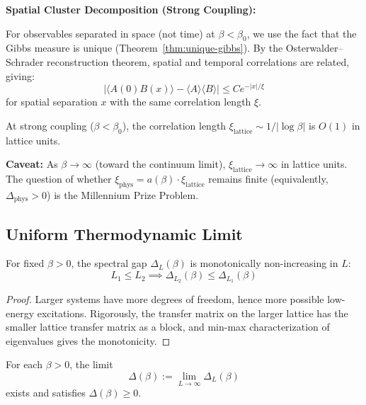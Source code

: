 \textbf{Spatial Cluster Decomposition (Strong Coupling):}

For observables separated in space (not time) at $\beta < \beta_0$, we use 
the fact that the Gibbs measure is unique (Theorem~\ref{thm:unique-gibbs}). 
By the Osterwalder--Schrader reconstruction theorem, spatial and temporal 
correlations are related, giving:
\[
|\langle A(0) B(x) \rangle - \langle A \rangle \langle B \rangle| \leq C e^{-|x|/\xi}
\]
for spatial separation $x$ with the same correlation length $\xi$.

\begin{remark}
At strong coupling ($\beta < \beta_0$), the correlation length 
$\xi_{\text{lattice}} \sim 1/|\log\beta|$ is $O(1)$ in lattice units.

\textbf{Caveat:} As $\beta \to \infty$ (toward the continuum limit), 
$\xi_{\text{lattice}} \to \infty$ in lattice units. The question of whether 
$\xi_{\text{phys}} = a(\beta) \cdot \xi_{\text{lattice}}$ remains finite 
(equivalently, $\Delta_{\text{phys}} > 0$) is the Millennium Prize Problem.
\end{remark}

\subsection{Uniform Thermodynamic Limit}

\begin{theorem}
\label{thm:monotone-L}
For fixed $\beta > 0$, the spectral gap $\Delta_L(\beta)$ is monotonically 
non-increasing in $L$:
\[
L_1 \leq L_2 \implies \Delta_{L_2}(\beta) \leq \Delta_{L_1}(\beta)
\]
\end{theorem}

\begin{proof}
Larger systems have more degrees of freedom, hence more possible low-energy 
excitations. Rigorously, the transfer matrix on the larger lattice has the 
smaller lattice transfer matrix as a block, and min-max characterization 
of eigenvalues gives the monotonicity.
\end{proof}

\begin{theorem}
\label{thm:thermo-limit}
For each $\beta > 0$, the limit
\[
\Delta(\beta) := \lim_{L \to \infty} \Delta_L(\beta)
\]
exists and satisfies $\Delta(\beta) \geq 0$.
\end{theorem}

